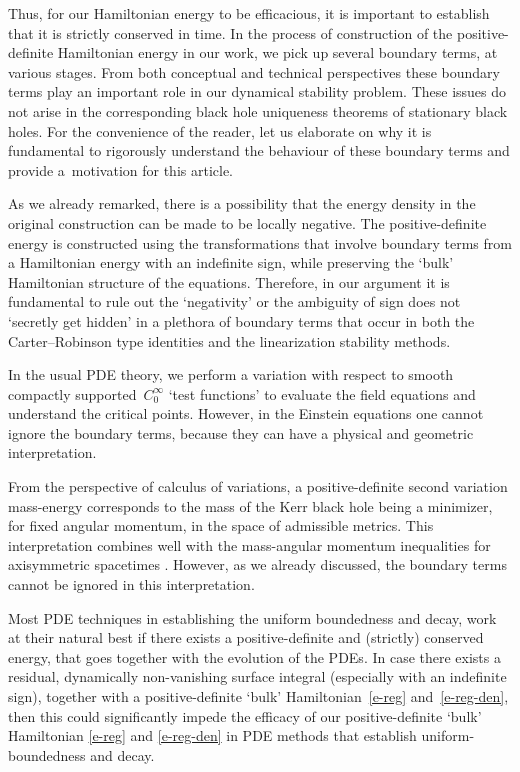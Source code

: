 Thus, for our Hamiltonian energy to be efficacious, it is important to establish that it is strictly conserved in time. In the process of construction of the positive-definite Hamiltonian energy in our work, we pick up several boundary terms, at various stages. From both conceptual and technical perspectives these boundary terms play an important role in our dynamical stability problem. These issues do not arise in the corresponding black hole uniqueness theorems of stationary black holes. For the convenience of the reader, let us elaborate on why it is fundamental to rigorously understand the behaviour of these boundary terms and provide a~motivation for this article.

 As we already remarked, there is a possibility that the energy density in the original construction can be made to be locally negative. The positive-definite energy is constructed using the transformations that involve boundary terms from a Hamiltonian energy with an indefinite sign, while preserving the `bulk' Hamiltonian structure of the equations. Therefore, in our argument it is fundamental to rule out the `negativity' or the ambiguity of sign does not `secretly get hidden' in a plethora of boundary terms that occur in both the Carter--Robinson type identities and the linearization stability methods.

 In the usual PDE theory, we perform a variation with respect to smooth compactly supported~$C^\infty_0$ `test functions' to evaluate the field equations and understand the critical points. However, in the Einstein equations one cannot ignore the boundary terms, because they can have a physical and geometric interpretation.

 From the perspective of calculus of variations, a positive-definite second variation mass-energy corresponds to the mass of the Kerr black hole being a minimizer, for fixed angular momentum, in the space of admissible metrics. This interpretation combines well with the mass-angular momentum inequalities for axisymmetric spacetimes \cite{D09}. However, as we already discussed, the boundary terms cannot be ignored in this interpretation.

 Most PDE techniques in establishing the uniform boundedness and decay, work at their natural best if there exists a positive-definite and (strictly) conserved energy, that goes together with the evolution of the PDEs. In case there exists a residual, dynamically non-vanishing surface integral (especially with an indefinite sign), together with a positive-definite `bulk' Hamiltonian~\eqref{e-reg} and~\eqref{e-reg-den}, then this could significantly impede the efficacy of our positive-definite `bulk' Hamiltonian \eqref{e-reg} and \eqref{e-reg-den} in PDE methods that establish uniform-boundedness and decay.

